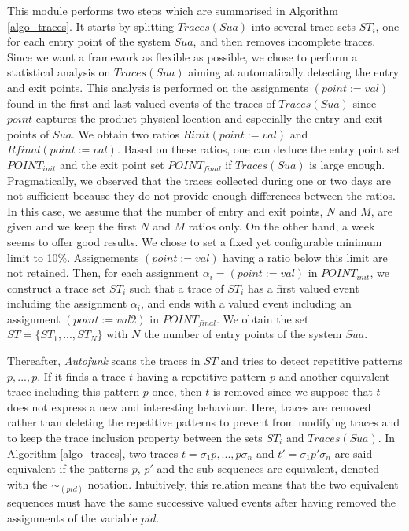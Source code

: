 This module performs two steps which are summarised in Algorithm
\ref{algo_traces}. It starts by splitting $Traces(Sua)$ into
several trace sets $ST_i$, one for each entry point of the system
$Sua$, and then removes incomplete traces. Since we want a
framework as flexible as possible, we chose to perform a
statistical analysis on $Traces(Sua)$ aiming at automatically
detecting the entry and exit points. This analysis is performed
on the assignments $(point:=val)$ found in the first and last
valued events of the traces of $Traces(Sua)$ since $point$
captures the product physical location and especially the entry
and exit points of $Sua$. We obtain two ratios
$Rinit(point:=val)$ and $Rfinal(point:=val)$.
Based on these ratios, one can deduce the entry point set
$POINT_{init}$ and the exit point set $POINT_{final}$ if
$Traces(Sua)$ is large enough. Pragmatically, we observed that
the traces collected during one or two days are not sufficient
because they do not provide enough differences between the
ratios. In this case, we assume that the number of entry and
exit points, $N$ and $M$, are given and we keep the first $N$ and
$M$ ratios only. On the other hand, a week seems to offer good
results. We chose to set a fixed yet configurable
minimum limit to 10\%. Assignements $(point:=val)$ having a ratio
below this limit are not retained. Then, for each assignment
$\alpha_i=(point:=val)$ in $POINT_{init}$, we construct a trace
set $ST_i$ such that a trace of $ST_i$ has a first valued event
including the assignment $\alpha_i$, and ends with a valued event
including an assignment $(point:=val2)$ in $POINT_{final}$. We
obtain the set $ST=\{ST_1,...,ST_N\}$ with $N$ the number of
entry points of the system $Sua$.

Thereafter, \textit{Autofunk} scans the traces in $ST$ and tries
to detect repetitive patterns $p,...,p$. If it finds a trace $t$
having a repetitive pattern $p$ and another equivalent trace
including this pattern $p$ once, then $t$ is removed since we
suppose that $t$ does not express a new and interesting
behaviour. Here, traces are removed rather than deleting the
repetitive patterns to prevent from modifying traces and to keep
the trace inclusion property between the sets $ST_i$ and
$Traces(Sua)$.
In Algorithm \ref{algo_traces}, two traces $t=\sigma_1 p,...,p
\sigma_n$ and $t'=\sigma_1 p' \sigma_n$ are said equivalent if
the patterns $p$, $p'$ and the sub-sequences are equivalent,
denoted with the $\sim_{(pid)}$ notation. Intuitively, this
relation means that the two equivalent sequences must have the
same successive valued events after having removed the
assignments of the variable $pid$.

